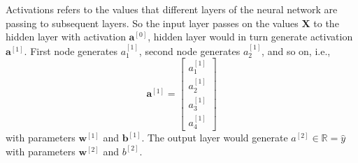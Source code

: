 \documentclass[12pt]{report}
\numberwithin{equation}{section}
\begin{document}
Activations refers to the values that different layers of the neural network are passing to subsequent layers. So the input layer passes on the values $\bm{X}$ to the hidden layer with activation $\bm{a}^{[0]}$, hidden layer would in turn generate activation $\bm{a}^{[1]}$. First node generates $a^{[1]}_1$, second node generates $a^{[1]}_2$, and so on, i.e.,
\[
\bm{a}^{[1]} = \left[\begin{array}{c}
					a^{[1]}_1 \\
					a^{[1]}_2 \\
					a^{[1]}_3 \\
					a^{[1]}_4
				   \end{array}\right]
\]
with parameters $\bm{w}^{[1]}$ and $\bm{b}^{[1]}$. The output layer would generate $a^{[2]}\in\mathbb{R} = \hat{y}$ with parameters $\bm{w}^{[2]}$ and $b^{[2]}$.
\end{document}
